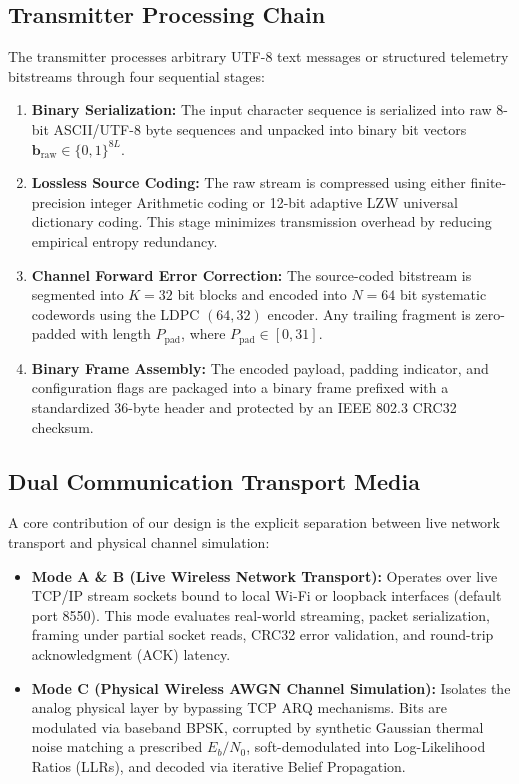 \documentclass[conference]{IEEEtran}
\begin{document}
\subsection{Transmitter Processing Chain}
The transmitter processes arbitrary UTF-8 text messages or structured telemetry bitstreams through four sequential stages:
\begin{enumerate}
    \item \textbf{Binary Serialization:} The input character sequence is serialized into raw 8-bit ASCII/UTF-8 byte sequences and unpacked into binary bit vectors $\mathbf{b}_{\text{raw}} \in \{0, 1\}^{8L}$.
    \item \textbf{Lossless Source Coding:} The raw stream is compressed using either finite-precision integer Arithmetic coding or 12-bit adaptive LZW universal dictionary coding. This stage minimizes transmission overhead by reducing empirical entropy redundancy.
    \item \textbf{Channel Forward Error Correction:} The source-coded bitstream is segmented into $K=32$ bit blocks and encoded into $N=64$ bit systematic codewords using the LDPC $(64, 32)$ encoder. Any trailing fragment is zero-padded with length $P_{\text{pad}}$, where $P_{\text{pad}} \in [0, 31]$.
    \item \textbf{Binary Frame Assembly:} The encoded payload, padding indicator, and configuration flags are packaged into a binary frame prefixed with a standardized 36-byte header and protected by an IEEE 802.3 CRC32 checksum.
\end{enumerate}

\subsection{Dual Communication Transport Media}
A core contribution of our design is the explicit separation between live network transport and physical channel simulation:
\begin{itemize}
    \item \textbf{Mode A \& B (Live Wireless Network Transport):} Operates over live TCP/IP stream sockets bound to local Wi-Fi or loopback interfaces (default port 8550). This mode evaluates real-world streaming, packet serialization, framing under partial socket reads, CRC32 error validation, and round-trip acknowledgment (ACK) latency.
    \item \textbf{Mode C (Physical Wireless AWGN Channel Simulation):} Isolates the analog physical layer by bypassing TCP ARQ mechanisms. Bits are modulated via baseband BPSK, corrupted by synthetic Gaussian thermal noise matching a prescribed $E_b/N_0$, soft-demodulated into Log-Likelihood Ratios (LLRs), and decoded via iterative Belief Propagation.
\end{itemize}
\end{document}
